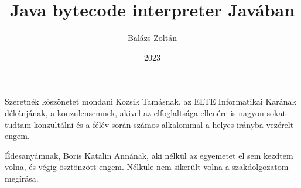 \documentclass[
]{elteikthesis}[2022/04/30]
\title{Java bytecode interpreter Javában} %
\date{2023} %
\author{Balázs Zoltán}
\affiliation{egyetemi docens} %
\begin{document}


\newcommand{\stagemagic}[1]{\textcolor{brown}{#1}}
\newcommand{\stageminor}[1]{\textcolor{orange}{#1}}
\newcommand{\stagemajor}[1]{\textcolor{red}{#1}}
\newcommand{\stageconstantsize}[1]{\textcolor{green}{#1}}
\newcommand{\stageconstantpool}[1]{\textcolor{teal}{#1}}
\newcommand{\stageaccessflags}[1]{\textcolor{blue}{#1}}
\newcommand{\stagethisclass}[1]{\textcolor{magenta}{#1}}
\newcommand{\stagesuperclass}[1]{\textcolor{violet}{#1}}
\newcommand{\stageinterfacesize}[1]{\textcolor{cyan}{#1}}
\newcommand{\stagefieldsize}[1]{\textcolor{orange}{#1}}
\newcommand{\stagemethodsize}[1]{\textcolor{red}{#1}}
\newcommand{\stagemethods}[1]{\textcolor{purple}{#1}}
\newcommand{\stageattributes}[1]{\textcolor{lime}{#1}}

\maketitle


\tableofcontents
\cleardoublepage{}


\cleardoublepage{}


\cleardoublepage{}


\cleardoublepage{}


\cleardoublepage{}

\chapter*{\acklabel}
Szeretnék köszönetet mondani Kozsik Tamásnak, az ELTE Informatikai Karának dékánjának, a konzulensemnek, akivel az elfoglaltsága ellenére is nagyon sokat tudtam konzultálni és a félév során számos alkalommal a helyes irányba vezérelt engem.

Édesanyámnak, Boris Katalin Annának, aki nélkül az egyemetet el sem kezdtem volna, és végig ösztönzött engem. Nélküle nem sikerült volna a szakdolgozatom megírása.
\end{document}
